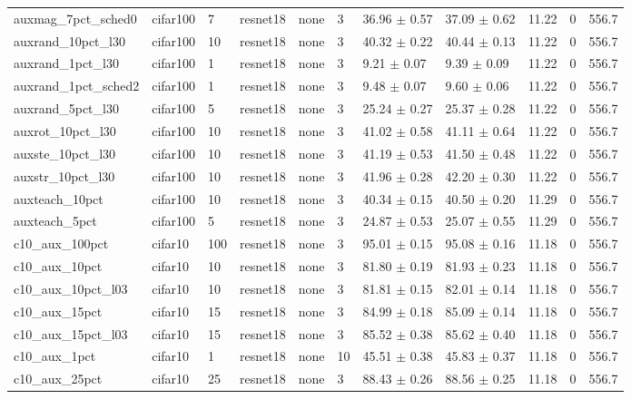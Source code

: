 \begin{tabular}{lllllllllll}
auxmag_7pct_sched0 & cifar100 & 7 & resnet18 & none & 3 & 36.96 $\pm$ 0.57 & 37.09 $\pm$ 0.62 & 11.22 & 0 & 556.7 \\
auxrand_10pct_l30 & cifar100 & 10 & resnet18 & none & 3 & 40.32 $\pm$ 0.22 & 40.44 $\pm$ 0.13 & 11.22 & 0 & 556.7 \\
auxrand_1pct_l30 & cifar100 & 1 & resnet18 & none & 3 & 9.21 $\pm$ 0.07 & 9.39 $\pm$ 0.09 & 11.22 & 0 & 556.7 \\
auxrand_1pct_sched2 & cifar100 & 1 & resnet18 & none & 3 & 9.48 $\pm$ 0.07 & 9.60 $\pm$ 0.06 & 11.22 & 0 & 556.7 \\
auxrand_5pct_l30 & cifar100 & 5 & resnet18 & none & 3 & 25.24 $\pm$ 0.27 & 25.37 $\pm$ 0.28 & 11.22 & 0 & 556.7 \\
auxrot_10pct_l30 & cifar100 & 10 & resnet18 & none & 3 & 41.02 $\pm$ 0.58 & 41.11 $\pm$ 0.64 & 11.22 & 0 & 556.7 \\
auxste_10pct_l30 & cifar100 & 10 & resnet18 & none & 3 & 41.19 $\pm$ 0.53 & 41.50 $\pm$ 0.48 & 11.22 & 0 & 556.7 \\
auxstr_10pct_l30 & cifar100 & 10 & resnet18 & none & 3 & 41.96 $\pm$ 0.28 & 42.20 $\pm$ 0.30 & 11.22 & 0 & 556.7 \\
auxteach_10pct & cifar100 & 10 & resnet18 & none & 3 & 40.34 $\pm$ 0.15 & 40.50 $\pm$ 0.20 & 11.29 & 0 & 556.7 \\
auxteach_5pct & cifar100 & 5 & resnet18 & none & 3 & 24.87 $\pm$ 0.53 & 25.07 $\pm$ 0.55 & 11.29 & 0 & 556.7 \\
c10_aux_100pct & cifar10 & 100 & resnet18 & none & 3 & 95.01 $\pm$ 0.15 & 95.08 $\pm$ 0.16 & 11.18 & 0 & 556.7 \\
c10_aux_10pct & cifar10 & 10 & resnet18 & none & 3 & 81.80 $\pm$ 0.19 & 81.93 $\pm$ 0.23 & 11.18 & 0 & 556.7 \\
c10_aux_10pct_l03 & cifar10 & 10 & resnet18 & none & 3 & 81.81 $\pm$ 0.15 & 82.01 $\pm$ 0.14 & 11.18 & 0 & 556.7 \\
c10_aux_15pct & cifar10 & 15 & resnet18 & none & 3 & 84.99 $\pm$ 0.18 & 85.09 $\pm$ 0.14 & 11.18 & 0 & 556.7 \\
c10_aux_15pct_l03 & cifar10 & 15 & resnet18 & none & 3 & 85.52 $\pm$ 0.38 & 85.62 $\pm$ 0.40 & 11.18 & 0 & 556.7 \\
c10_aux_1pct & cifar10 & 1 & resnet18 & none & 10 & 45.51 $\pm$ 0.38 & 45.83 $\pm$ 0.37 & 11.18 & 0 & 556.7 \\
c10_aux_25pct & cifar10 & 25 & resnet18 & none & 3 & 88.43 $\pm$ 0.26 & 88.56 $\pm$ 0.25 & 11.18 & 0 & 556.7 \\

\end{tabular}
